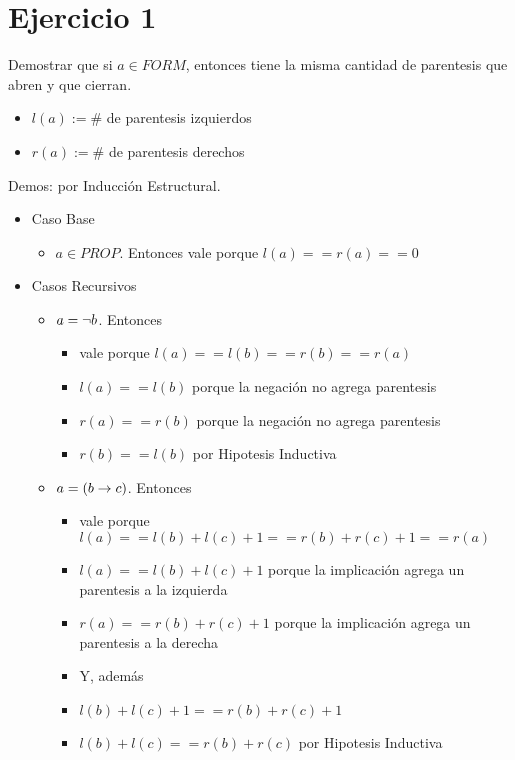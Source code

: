 \documentclass[14pt,a4paper,fleqn]{article}
\begin{document}
\section*{Ejercicio 1}
Demostrar que si $a \in FORM$, entonces tiene la misma cantidad de parentesis que abren y que cierran.
\begin{itemize}
	\item $l(a) := \#$ de parentesis izquierdos
	\item $r(a) := \#$ de parentesis derechos	
\end{itemize}
Demos: por Inducción Estructural.
\begin{itemize}
	\item Caso Base
		\begin{itemize}
			\item $a \in PROP$. Entonces vale porque $ l(a) == r(a) == 0$
		\end{itemize}
	\item Casos Recursivos
		\begin{itemize}
			\item $a = \neg b$. Entonces 
			\begin{itemize}
				\item vale porque $ l(a) == l(b) == r(b) == r(a)$
				\item $l(a) == l(b)$ porque la negación no agrega parentesis
				\item $r(a) == r(b)$ porque la negación no agrega parentesis
				\item $r(b) == l(b)$ por Hipotesis Inductiva
			\end{itemize}
			\item $a = (b \rightarrow c)$. Entonces
			\begin{itemize}
				\item vale porque $ l(a) == l(b) + l(c) + 1 == r(b) + r(c) + 1 == r(a)$
				\item $l(a) == l(b) + l(c) + 1$ porque la implicación agrega un parentesis a la izquierda
				\item $r(a) == r(b) + r(c) + 1$ porque la implicación agrega un parentesis a la derecha
				\item Y, además
				\item $l(b) + l(c) + 1 == r(b) + r(c) + 1$
				\item $l(b) + l(c) == r(b) + r(c)$ por Hipotesis Inductiva
			\end{itemize}
		\end{itemize}
\end{itemize}
\end{document}
